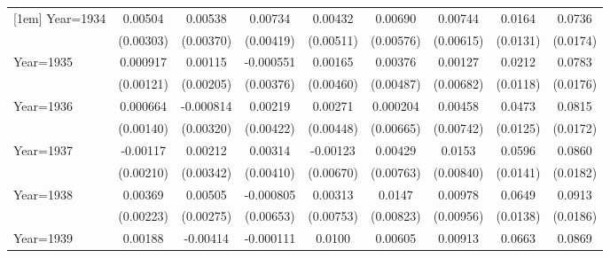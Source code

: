 \begin{table}[htbp]
\begin{tabular}{l*{8}{c}}
[1em]
Year=1934           &     0.00504\sym{*}  &     0.00538         &     0.00734\sym{*}  &     0.00432         &     0.00690         &     0.00744         &      0.0164         &      0.0736\sym{***}\\
                    &   (0.00303)         &   (0.00370)         &   (0.00419)         &   (0.00511)         &   (0.00576)         &   (0.00615)         &    (0.0131)         &    (0.0174)         \\
[1em]
Year=1935           &    0.000917         &     0.00115         &   -0.000551         &     0.00165         &     0.00376         &     0.00127         &      0.0212\sym{*}  &      0.0783\sym{***}\\
                    &   (0.00121)         &   (0.00205)         &   (0.00376)         &   (0.00460)         &   (0.00487)         &   (0.00682)         &    (0.0118)         &    (0.0176)         \\
[1em]
Year=1936           &    0.000664         &   -0.000814         &     0.00219         &     0.00271         &    0.000204         &     0.00458         &      0.0473\sym{***}&      0.0815\sym{***}\\
                    &   (0.00140)         &   (0.00320)         &   (0.00422)         &   (0.00448)         &   (0.00665)         &   (0.00742)         &    (0.0125)         &    (0.0172)         \\
[1em]
Year=1937           &    -0.00117         &     0.00212         &     0.00314         &    -0.00123         &     0.00429         &      0.0153\sym{*}  &      0.0596\sym{***}&      0.0860\sym{***}\\
                    &   (0.00210)         &   (0.00342)         &   (0.00410)         &   (0.00670)         &   (0.00763)         &   (0.00840)         &    (0.0141)         &    (0.0182)         \\
[1em]
Year=1938           &     0.00369\sym{*}  &     0.00505\sym{*}  &   -0.000805         &     0.00313         &      0.0147\sym{*}  &     0.00978         &      0.0649\sym{***}&      0.0913\sym{***}\\
                    &   (0.00223)         &   (0.00275)         &   (0.00653)         &   (0.00753)         &   (0.00823)         &   (0.00956)         &    (0.0138)         &    (0.0186)         \\
[1em]
Year=1939           &     0.00188         &    -0.00414         &   -0.000111         &      0.0100\sym{*}  &     0.00605         &     0.00913         &      0.0663\sym{***}&      0.0869\sym{***}\\

\end{tabular}
\end{table}
